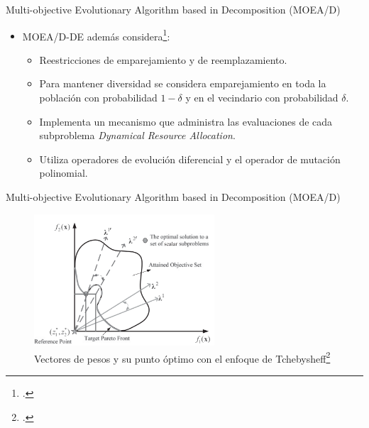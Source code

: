 \documentclass{beamer}
\begin{document}
\begin{frame}{Multi-objective Evolutionary Algorithm based in Decomposition (MOEA/D)}
\begin{itemize}
\scriptsize
\item MOEA/D-DE además considera\footcite{li2009multiobjective}: 
\begin{itemize}
\scriptsize
    \item Reestricciones de emparejamiento y de reemplazamiento.
    \item Para mantener diversidad se considera emparejamiento en toda la población con probabilidad $1 - \delta$ y en el vecindario con probabilidad $\delta$. 
    \item Implementa un mecanismo que administra las evaluaciones de cada subproblema \textit{Dynamical Resource Allocation}.
    \item Utiliza operadores de evolución diferencial y el operador de mutación polinomial.
\end{itemize}
\end{itemize}
\end{frame}



\begin{frame}{Multi-objective Evolutionary Algorithm based in Decomposition (MOEA/D)}

\begin{figure}[H]
\centering
\includegraphics[width=0.6\textwidth]{moead_diagrama.png}
\caption{\scriptsize Vectores de pesos y su punto óptimo con el enfoque de Tchebysheff\footcite{Joel:MOEAD_Adaptative}}
\end{figure}
\end{frame}
\end{document}
